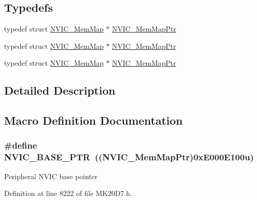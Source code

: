 \subsection*{Typedefs}
\begin{DoxyCompactItemize}
\item 
typedef struct \hyperlink{struct_n_v_i_c___mem_map}{N\+V\+I\+C\+\_\+\+Mem\+Map} $\ast$ \hyperlink{group___n_v_i_c___peripheral_ga685d87c766bb24fb3330aa8cc48fa0e7}{N\+V\+I\+C\+\_\+\+Mem\+Map\+Ptr}
\item 
typedef struct \hyperlink{struct_n_v_i_c___mem_map}{N\+V\+I\+C\+\_\+\+Mem\+Map} $\ast$ \hyperlink{group___n_v_i_c___peripheral_ga685d87c766bb24fb3330aa8cc48fa0e7}{N\+V\+I\+C\+\_\+\+Mem\+Map\+Ptr}
\item 
typedef struct \hyperlink{struct_n_v_i_c___mem_map}{N\+V\+I\+C\+\_\+\+Mem\+Map} $\ast$ \hyperlink{group___n_v_i_c___peripheral_ga685d87c766bb24fb3330aa8cc48fa0e7}{N\+V\+I\+C\+\_\+\+Mem\+Map\+Ptr}
\end{DoxyCompactItemize}


\subsection{Detailed Description}


\subsection{Macro Definition Documentation}
\subsubsection[{\texorpdfstring{N\+V\+I\+C\+\_\+\+B\+A\+S\+E\+\_\+\+P\+TR}{NVIC_BASE_PTR}}]{\setlength{\rightskip}{0pt plus 5cm}\#define N\+V\+I\+C\+\_\+\+B\+A\+S\+E\+\_\+\+P\+TR~(({\bf N\+V\+I\+C\+\_\+\+Mem\+Map\+Ptr})0x\+E000\+E100u)}\hypertarget{group___n_v_i_c___peripheral_ga28f0a055d0c218e16d1fc7b13ff0caa5}{}\label{group___n_v_i_c___peripheral_ga28f0a055d0c218e16d1fc7b13ff0caa5}
Peripheral N\+V\+IC base pointer 

Definition at line 8222 of file M\+K20\+D7.\+h.

